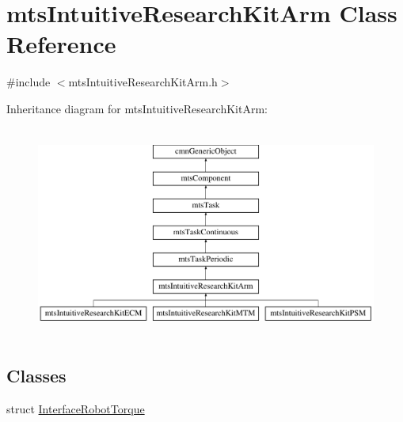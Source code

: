\hypertarget{classmts_intuitive_research_kit_arm}{}\section{mts\+Intuitive\+Research\+Kit\+Arm Class Reference}
\label{classmts_intuitive_research_kit_arm}


{\ttfamily \#include $<$mts\+Intuitive\+Research\+Kit\+Arm.\+h$>$}

Inheritance diagram for mts\+Intuitive\+Research\+Kit\+Arm\+:\begin{figure}[H]
\begin{center}
\leavevmode
\includegraphics[height=7.000000cm]{d8/dcf/classmts_intuitive_research_kit_arm}
\end{center}
\end{figure}
\subsection*{Classes}
\begin{DoxyCompactItemize}
\item 
struct \hyperlink{structmts_intuitive_research_kit_arm_1_1_interface_robot_torque}{Interface\+Robot\+Torque}
\end{DoxyCompactItemize}
